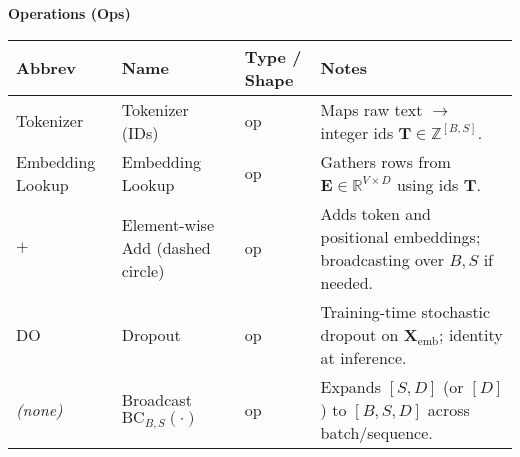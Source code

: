 \documentclass{article}
\begin{document}
\newpage
\renewcommand{\arraystretch}{1.2}
\small

\begin{center}
\textbf{Operations (Ops)}
\begin{tabular}{llll}
\hline
\textbf{Abbrev} & \textbf{Name} & \textbf{Type / Shape} & \textbf{Notes} \\
\hline
Tokenizer & Tokenizer (IDs) & op & Maps raw text $\to$ integer ids $\mathbf{T}\in\mathbb{Z}^{[B,S]}$. \\
Embedding Lookup & Embedding Lookup & op & Gathers rows from $\mathbf{E}\in\mathbb{R}^{V\times D}$ using ids $\mathbf{T}$. \\
$+$ & Element-wise Add (dashed circle) & op & Adds token and positional embeddings; broadcasting over $B,S$ if needed. \\
DO & Dropout & op & Training-time stochastic dropout on $\mathbf{X}_{\text{emb}}$; identity at inference. \\
\textit{(none)} & Broadcast $\mathrm{BC}_{B,S}(\cdot)$ & op & Expands $[S,D]$ (or $[D]$) to $[B,S,D]$ across batch/sequence. \\
\hline
\end{tabular}
\end{center}

\vspace{0.8em}
\end{document}
